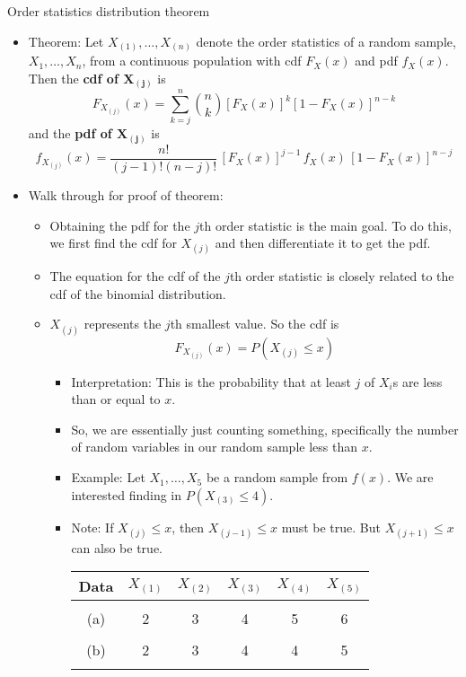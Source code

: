 \documentclass{article}
\newcommand{\vecn}[2]{#1_1, \ldots, #1_{#2}}	%
\newcommand{\order}[2]{#1_{(#2)}}		%
\begin{document}
Order statistics distribution theorem\bigskip
\begin{itemize}
    \item Theorem: Let $\order{X}{1}, \ldots, \order{X}{n}$ denote the order statistics of a random sample, $\vecn{X}{n}$, from a continuous population with cdf $F_X(x)$ and pdf $f_X(x)$. Then the \textbf{cdf of $\boldsymbol{\order{X}{j}}$} is
    \[F_{\order{X}{j}}(x) = \sum_{k = j}^n {n \choose k} [F_{X}(x)]^k [1- F_X(x)]^{n - k}\]
and the \textbf{pdf of $\boldsymbol{\order{X}{j}}$} is 
    \[f_{\order{X}{j}}(x) = \frac{n!}{(j - 1)!(n - j)!} \, [F_X(x)]^{j - 1} \, f_X(x) \, [1 - F_X(x)]^{n - j}\]\bigskip
    \item Walk through for proof of theorem:
    \begin{itemize}
        \item Obtaining the pdf for the $j$th order statistic is the main goal. To do this, we first find the cdf for $X_{(j)}$ and then differentiate it to get the pdf.
         \item[] The equation for the cdf of the $j$th order statistic is closely related to the cdf of the binomial distribution.
        \item $\order{X}{j}$ represents the $j$th smallest value. So the cdf is
        \[F_{\order{X}{j}}(x) = P(\order{X}{j} \le x)\]
        \begin{itemize}
            \item Interpretation: This is the probability that at least $j$ of $X_i$s are less than or equal to $x$.
            \item[] So, we are essentially just counting something, specifically the number of random variables in our random sample less than $x$.
            \item Example: Let $\vecn{X}{5}$ be a random sample from $f(x)$. We are interested finding in $P(\order{X}{3} \le 4)$.
            \item[] Note: If $\order{X}{j} \le x$, then $\order{X}{j-1} \le x$ must be true. But $\order{X}{j+1} \le x$ can also be true.\bigskip\\
            \begin{tabular}{c c c c c c}
                Data & $\order{X}{1}$ & $\order{X}{2}$ & $\order{X}{3}$ & $\order{X}{4}$ & $\order{X}{5}$\\
                \hline\\
                (a) & 2 & 3 & 4 & 5 & 6 \\\\
                (b) & 2 & 3 & 4 & 4 & 5 \\\\

\end{tabular}
\end{itemize}
\end{itemize}
\end{itemize}
\end{document}
